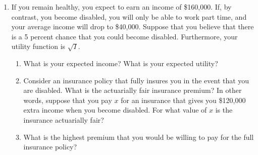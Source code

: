 \documentclass[11pt]{article}
\begin{document}
\begin{enumerate}
\item If you remain healthy, you expect to earn an income of \$160,000. If, by contrast, you become disabled, you will only be able to work part time, and your average income will drop to \$40,000. Suppose that you believe that there is a 5 percent chance that you could become disabled. Furthermore, your utility function is $\sqrt{I}$.
    \begin{enumerate}
    \item What is your expected income? What is your expected utility?

    \item Consider an insurance policy that fully insures you in the event that you are disabled. What is the actuarially fair insurance premium? In other words, suppose that you pay $x$ for an insurance that gives you \$120,000 extra income when you become disabled. For what value of $x$ is the insurance actuarially fair?

    \item What is the highest premium that you would be willing to pay for the full insurance policy?
    \end{enumerate}

\end{enumerate}
\end{document}
